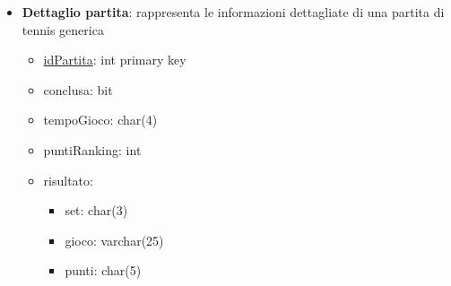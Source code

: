 \documentclass[10pt]{article}
\begin{document}
\begin{itemize}
    \item \textbf{Dettaglio partita}: rappresenta le informazioni dettagliate di una partita di tennis generica
    \begin{itemize}
        \item \underline{idPartita}: int primary key
        \item conclusa: bit
        \item tempoGioco: char(4)
        \item puntiRanking: int
        \item risultato:
        \begin{itemize}
            \item set: char(3)
            \item gioco: varchar(25) 
            \item punti: char(5)
        \end{itemize}
    \end{itemize}
    

\end{itemize}
\end{document}

